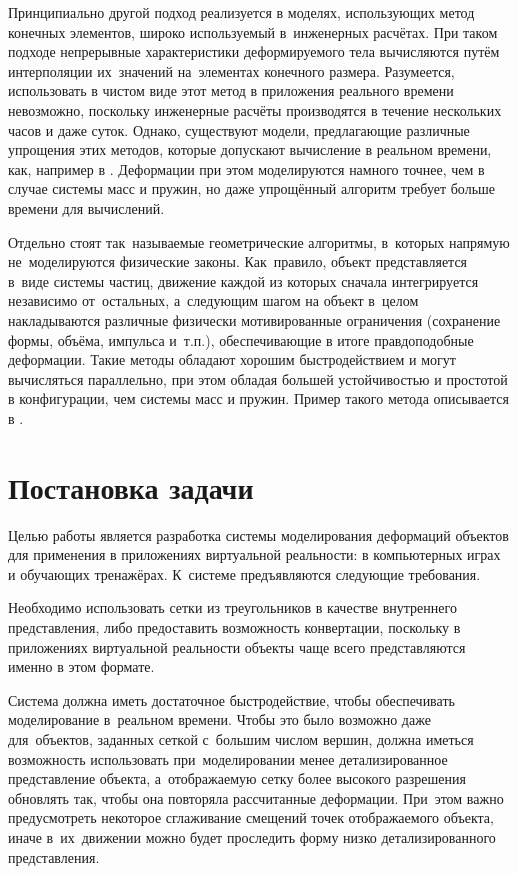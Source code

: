 \documentclass[a4paper,11pt]{report}
\begin{document}
    Принципиально другой подход реализуется в моделях, использующих метод конечных элементов, широко
    используемый в~инженерных расчётах. При таком подходе
    непрерывные характеристики деформируемого тела вычисляются путём интерполяции их~значений
    на~элементах конечного размера. Разумеется, использовать в чистом виде этот метод
    в приложения реального времени невозможно, поскольку инженерные расчёты производятся в
    течение нескольких часов и даже суток. Однако, существуют модели, предлагающие различные упрощения этих
    методов, которые допускают вычисление в реальном времени, как, например в \cite{mueller-stable}.
    Деформации при этом моделируются намного точнее, чем в случае системы масс и пружин, но даже
    упрощённый алгоритм требует больше времени для вычислений.

    Отдельно стоят так~называемые геометрические алгоритмы, в~которых напрямую не~моделируются
    физические законы. Как~правило, объект представляется в~виде системы частиц, движение каждой из
    которых сначала интегрируется независимо от~остальных, а~следующим шагом на объект в~целом
    накладываются различные физически мотивированные ограничения (сохранение формы, объёма, импульса
    и~т.п.), обеспечивающие в итоге правдоподобные деформации. Такие методы обладают хорошим
    быстродействием и могут вычисляться параллельно, при этом обладая большей устойчивостью и
    простотой в конфигурации, чем системы масс и пружин. Пример такого метода описывается в \cite{mueller-meshless}.

  \chapter{Постановка задачи}

    Целью работы является разработка системы моделирования деформаций объектов для применения в
    приложениях виртуальной реальности: в компьютерных играх и обучающих тренажёрах.
    К~системе предъявляются следующие требования.

    Необходимо использовать сетки из треугольников в качестве внутреннего представления, либо
    предоставить возможность конвертации, поскольку в приложениях виртуальной реальности объекты
    чаще всего представляются именно в этом формате.

    Система должна иметь достаточное быстродействие, чтобы обеспечивать моделирование в~реальном
    времени. Чтобы это было возможно даже для~объектов, заданных сеткой с~большим числом вершин,
    должна иметься возможность использовать при~моделировании менее детализированное представление
    объекта, а~отображаемую сетку более высокого разрешения обновлять так, чтобы она повторяла
    рассчитанные деформации. При~этом важно предусмотреть некоторое сглаживание смещений точек
    отображаемого объекта, иначе в~их~движении можно будет проследить форму низко детализированного
    представления.
\end{document}
